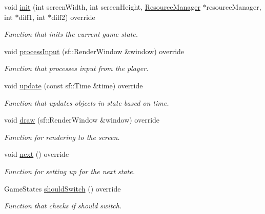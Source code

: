 \begin{DoxyCompactItemize}
\item 
void \hyperlink{classIntro__State_a354f772fa3f6077d19cb5de9f176905b}{init} (int screen\+Width, int screen\+Height, \hyperlink{classResourceManager}{Resource\+Manager} $\ast$resource\+Manager, int $\ast$diff1, int $\ast$diff2) override
\begin{DoxyCompactList}\small\item\em Function that inits the current game state. \end{DoxyCompactList}\item 
void \hyperlink{classIntro__State_a78936f89809b91e5308704c6be58f884}{process\+Input} (sf\+::\+Render\+Window \&window) override
\begin{DoxyCompactList}\small\item\em Function that processes input from the player. \end{DoxyCompactList}\item 
void \hyperlink{classIntro__State_a4ac6ebe7add817dbf8c95f538ffe812f}{update} (const sf\+::\+Time \&time) override
\begin{DoxyCompactList}\small\item\em Function that updates objects in state based on time. \end{DoxyCompactList}\item 
void \hyperlink{classIntro__State_a4bdfc33a18600e10d41989faa39ee41d}{draw} (sf\+::\+Render\+Window \&window) override
\begin{DoxyCompactList}\small\item\em Function for rendering to the screen. \end{DoxyCompactList}\item 
void \hyperlink{classIntro__State_a50f74ac2c305465f5d389f4003cef58b}{next} () override\hypertarget{classIntro__State_a50f74ac2c305465f5d389f4003cef58b}{}\label{classIntro__State_a50f74ac2c305465f5d389f4003cef58b}

\begin{DoxyCompactList}\small\item\em Function for setting up for the next state. \end{DoxyCompactList}\item 
Game\+States \hyperlink{classIntro__State_a403c4168d9e9f913657b1a9fb972e522}{should\+Switch} () override
\begin{DoxyCompactList}\small\item\em Function that checks if should switch. \end{DoxyCompactList}\end{DoxyCompactItemize}
